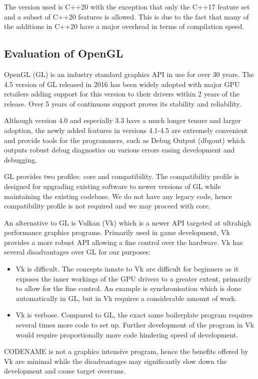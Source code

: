\documentclass[12pt, a4paper]{article}
\newenvironment{itemlist}
{\begin{itemize}
  \setlength{\itemsep}{0pt}}
{\end{itemize}}
\begin{document}
The version used is C++20 with the exception that only the C++17 feature set and a subset of C++20
features is allowed. This is due to the fact that many of the additions in C++20 have a major
overhead in terms of compilation speed.

\subsection{Evaluation of OpenGL}
OpenGL (GL) is an industry standard graphics API in use for over 30 years. The 4.5 version of GL
released in 2016 has been widely adopted with major GPU retailers adding support for this version to
their drivers within 2 years of the release. Over 5 years of continuous support proves its stability
and reliability.

Although version 4.0 and especially 3.3 have a much longer tenure and larger adoption, the newly
added features in versions 4.1-4.5 are extremely convenient and provide tools for the programmers,
such as Debug Output (dbgout) which outputs robust debug diagnostics on various errors easing
development and debugging.

GL provides two profiles: core and compatibility. The compatibility profile is designed for
upgrading existing software to newer versions of GL while maintaining the existing codebase. We do
not have any legacy code, hence compatibility profile is not required and we may proceed with core.

An alternative to GL is Vulkan (Vk) which is a newer API targeted at ultrahigh performance graphics
programs. Primarily used in game development, Vk provides a more robust API allowing a fine control
over the hardware. Vk has several disadvantages over GL for our purposes:
\begin{itemlist}
\item Vk is difficult. The concepts innate to Vk are difficult for beginners as it exposes the inner
  workings of the GPU drivers to a greater extent, primarily to allow for the fine control. An
  example is synchronisation which is done automatically in GL, but in Vk requires a considerable
  amount of work.
\item Vk is verbose. Compared to GL, the exact same boilerplate program requires several times more
  code to set up. Further development of the program in Vk would require proportionally more code
  hindering speed of development.
\end{itemlist}

CODENAME is not a graphics intensive program, hence the benefits offered by Vk are minimal while the
disadvantages may significantly slow down the development and cause target overruns.
\end{document}
